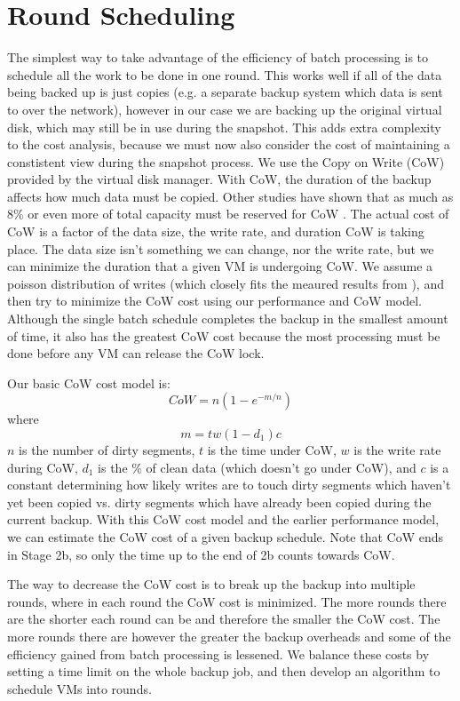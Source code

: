 \section{Round Scheduling}
\label{sect:scheduling}
The simplest way to take advantage of the efficiency of batch processing is to
schedule all the work to be done in one round.  This works well if all of the
data being backed up is just copies (e.g. a separate backup system which data
is sent to over the network), however in our case we are backing up the
original virtual disk, which may still be in use during the snapshot. This adds
extra complexity to the cost analysis, because we must now also consider the
cost of maintaining a constistent view during the snapshot process. We use the
Copy on Write (CoW) provided by the virtual disk manager. With CoW, the
duration of the backup affects how much data must be copied. Other studies have
shown that as much as 8\% or even more of total capacity must be reserved for
CoW \cite{EMCIncrementalDataChanges}. The actual cost of CoW is a factor of the
data size, the write rate, and duration CoW is taking place. The data size
isn't something we can change, nor the write rate, but we can minimize the
duration that a given VM is undergoing CoW. We assume a poisson distribution of
writes (which closely fits the meaured results from
\cite{EMCIncrementalDataChanges}), and then try to minimize the CoW cost using
our performance and CoW model. Although the single batch schedule completes the
backup in the smallest amount of time, it also has the greatest CoW cost
because the most processing must be done before any VM can release the CoW
lock.

Our basic CoW cost model is:
\[
    CoW=n(1-e^{-m/n})
\]
    where \[ m=tw(1-d_1)c \]
$n$ is the number of dirty segments, $t$ is the time under CoW, $w$ is the
write rate during CoW, $d_1$ is the \% of clean data (which doesn't go under
CoW), and $c$ is a constant determining how likely writes are to touch dirty
segments which haven't yet been copied vs. dirty segments which have already
been copied during the current backup. With this CoW cost model and the earlier
performance model, we can estimate the CoW cost of a given backup schedule.
Note that CoW ends in Stage 2b, so only the time up to the end of 2b counts
towards CoW. 

The way to decrease the CoW cost is to break up the backup into multiple
rounds, where in each round the CoW cost is minimized. The more rounds there
are the shorter each round can be and therefore the smaller the CoW cost. The
more rounds there are however the greater the backup overheads and some of the
efficiency gained from batch processing is lessened. We balance these costs by
setting a time limit on the whole backup job, and then develop an algorithm to
schedule VMs into rounds.

